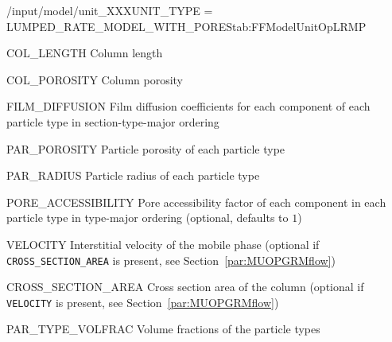 \begin{condsubgroup}{/input/model/unit\_XXX}{UNIT\_TYPE = LUMPED\_RATE\_MODEL\_WITH\_PORES}{tab:FFModelUnitOpLRMP}
  \begin{dataset}[unit=\si{\metre},type=double,range={$> 0$},length={1}]{COL\_LENGTH}
    Column length
  \end{dataset}
  \begin{dataset}[unit=--,type=double,range={$[0,1]$},length={1}]{COL\_POROSITY}
    Column porosity
  \end{dataset}
  \begin{dataset}[unit=\si{\metre\per\second},type=double,range={$\geq 0$},length={$\texttt{NPARTYPE} \cdot \texttt{NCOMP}$ / $\texttt{NPARTYPE} \cdot \texttt{NCOMP} \cdot \texttt{NSEC}$}]{FILM\_DIFFUSION}
    Film diffusion coefficients for each component of each particle type in section-type-major ordering
  \end{dataset}
  \begin{dataset}[unit=--,type=double,range={$[0,1]$},length={\texttt{NPARTYPE}}]{PAR\_POROSITY}
    Particle porosity of each particle type
  \end{dataset}
  \begin{dataset}[unit=\si{\metre},type=double,range={$>0$},length={\texttt{NPARTYPE}}]{PAR\_RADIUS}
    Particle radius of each particle type
  \end{dataset}
  \begin{dataset}[unit=--,type=double,range={$(0, 1]$},length={$\texttt{NPARTYPE} \cdot \texttt{NCOMP}$}]{PORE\_ACCESSIBILITY}
    Pore accessibility factor of each component in each particle type in type-major ordering (optional, defaults to $1$)
  \end{dataset}
  \begin{dataset}[unit=\si{\metre\per\second},type=double,range={$\mathds{R}$},length={1 / \texttt{NSEC}}]{VELOCITY}
    Interstitial velocity of the mobile phase (optional if \texttt{CROSS\_SECTION\_AREA} is present, see Section~\ref{par:MUOPGRMflow})
  \end{dataset}
  \begin{dataset}[unit=\si{\square\metre},type=double,range={$>0$},length={1}]{CROSS\_SECTION\_AREA}
    Cross section area of the column (optional if \texttt{VELOCITY} is present, see Section~\ref{par:MUOPGRMflow})
  \end{dataset}
  \begin{dataset}[unit=--,type=double,range={$[0,1]$},length={\texttt{NPARTYPE}}]{PAR\_TYPE\_VOLFRAC}
    Volume fractions of the particle types
  \end{dataset}
\end{condsubgroup}

